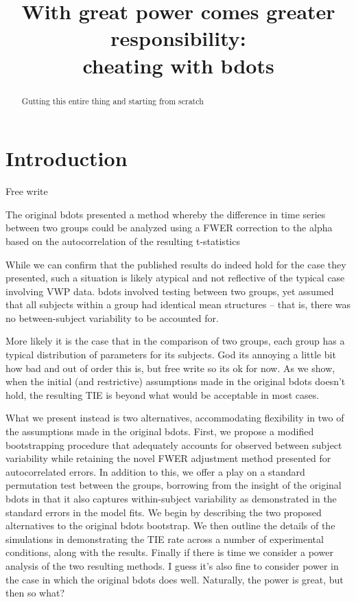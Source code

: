 \documentclass{article}
\title{With great power comes greater responsibility: \\
\large cheating with bdots}
\date{}
\begin{document}

\maketitle

%

\begin{abstract}
Gutting this entire thing and starting from scratch


\end{abstract}

\section{Introduction}

Free write

The original bdots presented a method whereby the difference in time series between two groups could be analyzed using a FWER correction to the alpha based on the autocorrelation of the resulting t-statistics

While we can confirm that the published results do indeed hold for the case they presented, such a situation is likely atypical and not reflective of the typical case involving VWP data. bdots involved testing between two groups, yet assumed that all subjects within a group had identical mean structures -- that is, there was no between-subject variability to be accounted for.

More likely it is the case that in the comparison of two groups, each group has a typical distribution of parameters for its subjects. God its annoying a little bit how bad and out of order this is, but free write so its ok for now. As we show, when the initial (and restrictive) assumptions made in the original bdots doesn't hold, the resulting TIE is beyond what would be acceptable in most cases.

What we present instead is two alternatives, accommodating flexibility in two of the assumptions made in the original bdots. First, we propose a modified bootstrapping procedure that adequately accounts for observed between subject variability while retaining the novel FWER adjustment method presented for autocorrelated errors. In addition to this, we offer a play on a standard permutation test between the groups, borrowing from the insight of the original bdots in that it also captures within-subject variability as demonstrated in the standard errors in the model fits. We begin by describing the two proposed alternatives to the original bdots bootstrap. We then outline the details of the simulations in demonstrating the TIE rate across a number of experimental conditions, along with the results. Finally if there is time we consider a power analysis of the two resulting methods. I guess it's also fine to consider power in the case in which the original bdots does well. Naturally, the power is great, but then so what?
\end{document}
